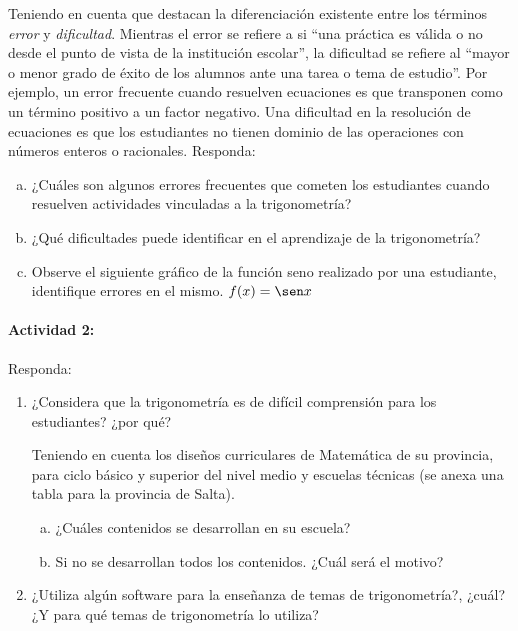 \documentclass[oneside,spanish]{amsart}
\numberwithin{equation}{section}
\numberwithin{figure}{section}
\begin{document}
Teniendo en cuenta que \citet{godino-batanero-font} destacan la diferenciación existente entre los términos \textit{error} y \textit{dificultad}. Mientras el error se refiere a si “una práctica es válida o no desde el punto de vista de la institución escolar”, la dificultad se refiere al “mayor o menor grado de éxito de los alumnos ante una tarea o tema de estudio”. Por ejemplo, un error frecuente  cuando resuelven ecuaciones es que transponen como un término positivo a un factor negativo. Una dificultad en la resolución de ecuaciones es que los estudiantes no tienen dominio de las operaciones con números enteros o racionales. Responda:

\begin{enumerate}[a.]
	\item ¿Cuáles son algunos errores frecuentes que cometen los estudiantes cuando resuelven actividades vinculadas a la trigonometría?
	
	\item ¿Qué dificultades puede identificar en el aprendizaje de la trigonometría?
	
	\item Observe el siguiente gráfico de la función seno realizado por una estudiante, identifique errores en el mismo. $f(x)= \sen x$
\end{enumerate}

\bigskip

\paragraph{Actividad 2:}

Responda:

\begin{enumerate}[2.1.]
	\item ¿Considera que la trigonometría es de difícil comprensión para los estudiantes? ¿por qué?
	
	Teniendo en cuenta los diseños curriculares de Matemática de su provincia, para ciclo básico y superior del nivel medio y escuelas técnicas (se anexa una tabla para la provincia de Salta).
	\begin{enumerate}[a.]
		\item ¿Cuáles contenidos se desarrollan en su escuela?
		\item Si no se desarrollan todos los contenidos. ¿Cuál será el motivo?
	\end{enumerate}
	
	\item ¿Utiliza algún software para la enseñanza de temas de trigonometría?, ¿cuál? ¿Y para qué temas de trigonometría  lo utiliza?
\end{enumerate}
\end{document}
